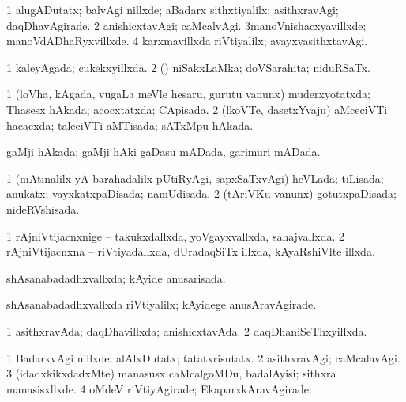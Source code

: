 {{\bentry
{} 
\gl{\kirxvi}
\expl{}
\bmng
\bnum
\num{1} alugADutatx; balvAgi nillxde; aBadarx sithxtiyalilx; asithxravAgi; daqDhavAgirade. 
\num{2} anishicxtavAgi; caMcalvAgi. 
\num{3}manoVnishacxyavillxde; manoVdADhaRyxvillxde. 
\num{4} karxmavillxda riVtiyalilx; avayxvasithxtavAgi. 
\enum
\emng
\eentry

\bentry
{} 
\gl{\gu}
\expl{}
\bmng
\bnum
\num{1} kaleyAgada; cukekxyillxda. 
\num{2} (\rUpa) niSakxLaMka; doVSarahita; niduRSaTx. 
\enum
\emng
\eentry

\bentry
{} 
\gl{\gu}
\expl{}
\bmng
\bnum
\num{1} (loVha, kAgada, \mo vugaLa meVle hesaru, gurutu \mo vanunx) muderxyotatxda; Thasesx hAkada; acocxtatxda; CApisada. 
\num{2} (lkoVTe, dasetxYvaju) aMceciVTi hacacxda; taleciVTi aMTisada; sATxMpu hAkada. 
\enum
\emng
\eentry

\bentry
{} 
\gl{\gu}
\expl{}
\bmng
gaMji hAkada; gaMji hAki gaDasu mADada, garimuri mADada. 
\emng
\eentry

\bentry
{} 
\gl{\gu}
\expl{}
\bmng
\bnum
\num{1} (mAtinalilx yA barahadalilx pUtiRyAgi, sapxSaTxvAgi) heVLada; tiLisada; anukatx; vayxkatxpaDisada; namUdisada. 
\num{2} (tAriVKu \mo vanunx) gotutxpaDisada; nideRVshisada. 
\enum
\emng
\eentry

\bentry
{} 
\gl{\gu}
\expl{}
\bmng
\bnum
\num{1} rAjniVtijacnxnige -- takukxdallxda, yoVgayxvallxda, sahajvallxda. 
\num{2} rAjniVtijacnxna -- riVtiyadallxda, dUradaqSiTx illxda, kAyaRshiVlte illxda. 
\enum
\emng
\eentry

\bentry
{} 
\gl{\gu}
\expl{}
\bmng
shAsanabadadhxvallxda; kAyide anusarisada. 
\emng
\eentry

\bentry
{} 
\gl{\kirxvi}
\expl{}
\bmng
shAsanabadadhxvallxda riVtiyalilx; kAyidege anusAravAgirade. 
\emng
\eentry

\bentry
{} 
\gl{\gu}
\expl{}
\bmng
\bnum
\num{1} asithxravAda; daqDhavillxda; anishicxtavAda. 
\num{2} daqDhaniSeThxyillxda. 
\enum
\emng
\eentry

\bentry
{} 
\gl{\gu}
\expl{}
\bmng
\bnum
\num{1} BadarxvAgi nillxde; alAlxDutatx; tatatxrisutatx. 
\num{2} asithxravAgi; caMcalavAgi. 
\num{3} (idadxkikxdadxMte) manasusx caMcalgoMDu, badalAyisi; sithxra manasisxllxde. 
\num{4} oMdeV riVtiyAgirade; EkaparxkAravAgirade. 
\enum
\emng
\eentry

}}
